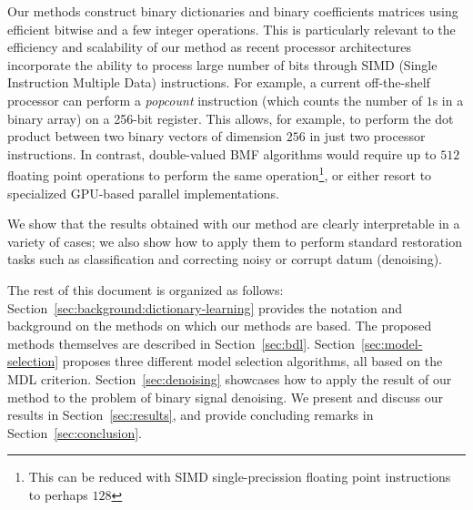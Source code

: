 \documentclass[twocolumn]{IEEEtran}
\theoremstyle{definition}
\begin{document}
Our methods construct binary dictionaries and binary coefficients matrices using efficient bitwise and a few integer operations. This is particularly relevant to the efficiency and scalability of our method as recent processor architectures incorporate the ability to process large number of bits through SIMD (Single Instruction Multiple Data) instructions. For example, a current off-the-shelf processor can perform a \emph{popcount} instruction (which counts the number of $1$s in a binary array) on a 256-bit register. This allows, for example, to perform the dot product between two binary vectors of dimension $256$ in just two processor instructions. In contrast, double-valued BMF algorithms would require up to $512$ floating point operations to perform the same operation\footnote{This can be reduced with SIMD single-precission floating point instructions to perhaps $128$}, or either resort to specialized GPU-based parallel implementations.


We show that the results obtained with our method are clearly interpretable in a variety of cases; we also show how to apply them to perform standard restoration tasks such as classification and correcting noisy or corrupt datum (denoising).

The rest of this document is organized as follows: Section~\ref{sec:background:dictionary-learning} provides the notation and background on the methods on which our methods are based. The proposed methods themselves are described in Section~\ref{sec:bdl}.
Section~\ref{sec:model-selection} proposes three different model selection algorithms, all based on the MDL criterion. Section~\ref{sec:denoising} showcases how to apply the result of our method to the problem of binary signal denoising. We present and discuss our results in Section~\ref{sec:results}, and provide concluding remarks in Section~\ref{sec:conclusion}.
\end{document}
